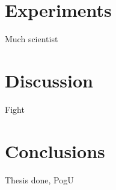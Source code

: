 \documentclass[sigconf]{acmart}
\begin{document}
\section{Experiments}
\label{sec:Experiments}

Much scientist

\section{Discussion}
\label{sec:Discussion}

Fight

\section{Conclusions}
\label{sec:Conclusions}
Thesis done, PogU



\end{document}
